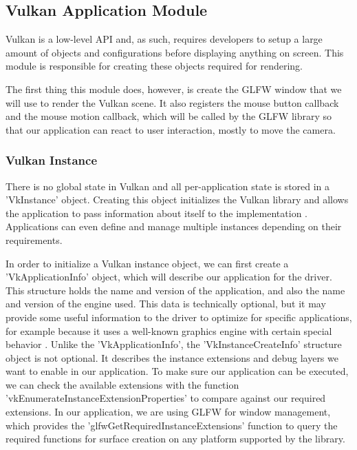 \subsection{Vulkan Application Module}
Vulkan is a low-level API and, as such, requires developers to setup a large amount of objects and configurations before displaying anything on screen. This module is responsible for creating these objects required for rendering.

The first thing this module does, however, is create the GLFW window that we will use to render the Vulkan scene. It also registers the mouse button callback and the mouse motion callback, which will be called by the GLFW library so that our application can react to user interaction, mostly to move the camera.

\subsubsection{Vulkan Instance}
There is no global state in Vulkan and all per-application state is stored in a 'VkInstance' object. Creating this object initializes the Vulkan library and allows the application to pass information about itself to the implementation \cite{vulkan_docs}. Applications can even define and manage multiple instances depending on their requirements.

In order to initialize a Vulkan instance object, we can first create a 'VkApplicationInfo' object, which will describe our application for the driver. This structure holds the name and version of the application, and also the name and version of the engine used. This data is technically optional, but it may provide some useful information to the driver to optimize for specific applications, for example because it uses a well-known graphics engine with certain special behavior \cite{vulkan_tutorial}. Unlike the 'VkApplicationInfo', the 'VkInstanceCreateInfo' structure object is not optional. It describes the instance extensions and debug layers we want to enable in our application. To make sure our application can be executed, we can check the available extensions with the function 'vkEnumerateInstanceExtensionProperties' to compare against our required extensions. In our application, we are using GLFW for window management, which provides the 'glfwGetRequiredInstanceExtensions' function \cite{glfw_vulkan} to query the required functions for surface creation on any platform supported by the library.

